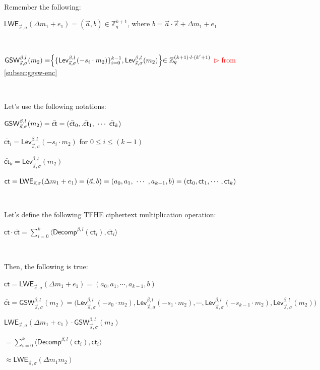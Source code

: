 $ $

\noindent Remember the following: 

$\textsf{LWE}_{\vec{s}, \sigma}(\Delta m_1 + e_1) = (\vec{a}, b) \in \mathbb{Z}_{q}^{k + 1}$, where $b = \vec{a} \cdot \vec{s} + \Delta m_1 + e_1$ 

$ $

$\textsf{GSW}_{\vec{s}, \sigma}^{\beta, l}(m_2) = \Bigr \{ \{ \textsf{Lev}_{\vec{s}, \sigma}^{\beta, l} (-s_i \cdot m_2)  \}_{i=0}^{k-1}, \textsf{Lev}_{\vec{s}, \sigma}^{\beta, l}(m_2) \Bigl \} \in \mathbb{Z}_{q }^{(k+1) \cdot l \cdot (k'+1)}$ \textcolor{red}{ $\rhd$ from \autoref{subsec:ggsw-enc}}

$ $

\noindent Let's use the following notations:

$\textsf{GSW}_{\vec{s}, \sigma}^{\beta, l}(m_2) = {\bar{\textsf{ct}}} = (\bar{\textsf{ct}}_0,. \bar{\textsf{ct}}_1, \text{ } \text{$\cdots$} \text{ } \bar{\textsf{ct}}_k)$ 

$\bar{\textsf{ct}}_i = \textsf{Lev}_{\vec{s}, \sigma}^{\beta, l}(-s_i \cdot m_2)$ for $0 \leq i \leq (k-1)$

$\bar{\textsf{ct}}_k = \textsf{Lev}_{\vec{s}, \sigma}^{\beta, l}(m_2)$

$\textsf{ct} = \textsf{LWE}_{\vec{s}, \sigma}(\Delta m_1 + e_1) = (\vec{a}, b) = (a_0, a_1, \text{ } \text{$\cdots$} \text{ }, a_{k-1}, b) = (\textsf{ct}_0, \textsf{ct}_1, \cdots, \textsf{ct}_k)$

$ $

\noindent Let's define the following TFHE ciphertext multiplication operation: 

$\textsf{ct} \cdot {\bar{\textsf{ct}}} = \sum\limits_{i=0}^{k}\langle \textsf{Decomp}^{\beta, l}(\textsf{ct}_i), \bar{\textsf{ct}}_i \rangle$

$ $

\noindent Then, the following is true:

\begin{tcolorbox}[title={\textbf{\tboxlabel{\ref*{subsec:tfhe-mult-cipher}} TFHE Ciphertext-to-Ciphertext Multiplication}}]
$\textsf{ct} = \textsf{LWE}_{\vec{s}, \sigma}(\Delta m_1 + e_1) = (a_0, a_1, \cdots, a_{k-1}, b)$

$\bar{\textsf{ct}} = \textsf{GSW}_{\vec{s}, \sigma}^{\beta, l}(m_2) = \bm( \textsf{Lev}_{\vec{s}, \sigma}^{\beta, l}(-s_0\cdot m_2), \textsf{Lev}_{\vec{s}, \sigma}^{\beta, l}(-s_1\cdot m_2), \cdots, \textsf{Lev}_{\vec{s}, \sigma}^{\beta, l}(-s_{k-1}\cdot m_2), \textsf{Lev}_{\vec{s}, \sigma}^{\beta, l}(m_2)  \bm)$

$\textsf{LWE}_{\vec{s}, \sigma}(\Delta m_1 + e_1) \cdot \textsf{GSW}_{\vec{s}, \sigma}^{\beta, l}(m_2) $

$= \sum\limits_{i=0}^{k}\langle \textsf{Decomp}^{\beta, l}(\textsf{ct}_i), \bar{\textsf{ct}}_i \rangle $

$\approx \textsf{LWE}_{\vec{s}, \sigma}(\Delta m_1 m_2)$
\end{tcolorbox}

